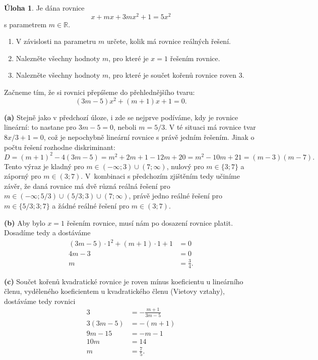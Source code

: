 \documentclass[12pt,a4paper]{article}
\newcommand{\R}{\mathbb{R}}
\theoremstyle{definition}
\newtheorem{uloha}{Úloha}
\newenvironment{res}{\proof}{\endproof}
\begin{document}
\begin{uloha}
Je dána rovnice
\[ x + m x + 3 m x^2 + 1 = 5 x^2 \]
s parametrem $m \in \R$.
\begin{enumerate}
	\item V závislosti na parametru $m$ určete, kolik má rovnice reálných řešení.
	\item Nalezněte všechny hodnoty $m$, pro které je $x = 1$ řešením rovnice.
	\item Nalezněte všechny hodnoty $m$, pro které je součet kořenů rovnice roven $3$.
\end{enumerate}
\end{uloha}
\begin{res}
Začneme tím, že si rovnici přepíšeme do přehlednějšího tvaru:
\[ (3m-5)x^2 + (m+1)x + 1 = 0. \]
\par
\noindent\textbf{(a)} Stejně jako v předchozí úloze, i zde se nejprve podíváme, kdy je rovnice lineární: to nastane pro $3m - 5 = 0$, neboli $m = 5/3$. V té situaci má rovnice tvar $8x/3 + 1 = 0$, což je nepochybně lineární rovnice s právě jedním řešením. Jinak o počtu řešení rozhodne diskriminant:
\[ D = (m+1)^2 - 4(3m-5) = m^2 + 2m + 1 - 12m + 20 = m^2 - 10m + 21 = (m-3)(m-7). \]
Tento výraz je kladný pro $m \in (-\infty; 3) \cup (7; \infty)$, nulový pro $m \in \{3; 7\}$ a záporný pro $m \in (3; 7)$. V~kombinaci s předchozím zjištěním tedy učiníme závěr, že daná rovnice má dvě různá reálná řešení pro $m \in (-\infty; 5/3) \cup (5/3; 3) \cup (7; \infty)$, právě jedno reálné řešení pro $m \in \{5/3; 3; 7\}$ a žádné reálné řešení pro $m \in (3; 7)$.

\par\medskip\noindent\textbf{(b)}
Aby bylo $x = 1$ řešením rovnice, musí nám po dosazení rovnice platit. Dosadíme tedy a dostáváme
\begin{align*}
(3m-5) \cdot 1^2 + (m+1) \cdot 1 + 1 &= 0 \\
4m - 3 &= 0 \\
m &= \tfrac34.
\end{align*}

\par\medskip\noindent\textbf{(c)}
Součet kořenů kvadratické rovnice je roven mínus koeficientu u lineárního členu, vyděleného koeficientem u kvadratického členu (Vietovy vztahy), dostáváme tedy rovnici
\begin{align*}
3 &= -\tfrac{m+1}{3m-5} \\
3(3m-5) &= -(m+1) \\
9m - 15 &= -m - 1 \\
10m &= 14 \\
m &= \tfrac{7}{5}.
\end{align*}
\end{res}
\end{document}
